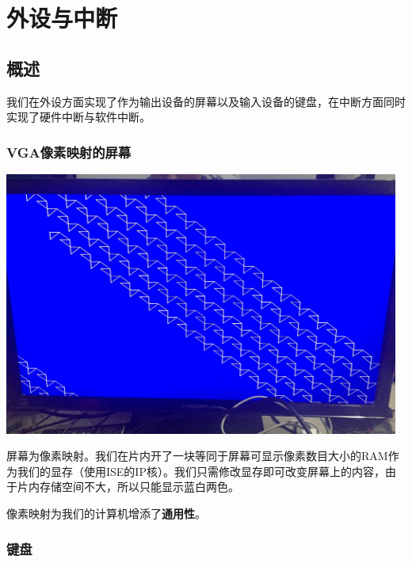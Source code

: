 \section{外设与中断}

\subsection{概述}

我们在外设方面实现了作为输出设备的屏幕以及输入设备的键盘，在中断方面同时实现了硬件中断与软件中断。

\subsubsection{VGA像素映射的屏幕}

\begin{center}
    \includegraphics[width=13cm]{image/extension/tri.JPG}
    \label{fig:tri}
\end{center}

屏幕为像素映射。我们在片内开了一块等同于屏幕可显示像素数目大小的RAM作为我们的显存（使用ISE的IP核）。我们只需修改显存即可改变屏幕上的内容，由于片内存储空间不大，所以只能显示蓝白两色。

像素映射为我们的计算机增添了\textbf{通用性}。

\subsubsection{键盘}

